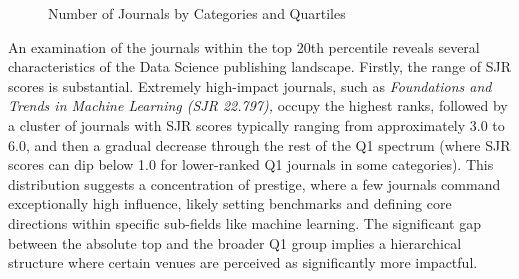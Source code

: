 \documentclass[../main.tex]{subfiles}
\begin{document}
\begin{enumerate}
    \begin{figure}[H]
        \centering
        \caption{Number of Journals by Categories and Quartiles}
        \label{fig:journal_categories_quartiles}
    \end{figure}
    
\end{enumerate}

\vspace{0.2cm}
\noindent
An examination of the journals within the top 20th percentile reveals several characteristics of the Data Science publishing landscape. Firstly, the range of SJR scores is substantial. Extremely high-impact journals, such as  \textit{Foundations and Trends in Machine Learning (SJR 22.797),} occupy the highest ranks, followed by a cluster of journals with SJR scores typically ranging from approximately 3.0 to 6.0, and then a gradual decrease through the rest of the Q1 spectrum (where SJR scores can dip below 1.0 for lower-ranked Q1 journals in some categories). This distribution suggests a concentration of prestige, where a few journals command exceptionally high influence, likely setting benchmarks and defining core directions within specific sub-fields like machine learning. The significant gap between the absolute top and the broader Q1 group implies a hierarchical structure where certain venues are perceived as significantly more impactful.
\end{document}
